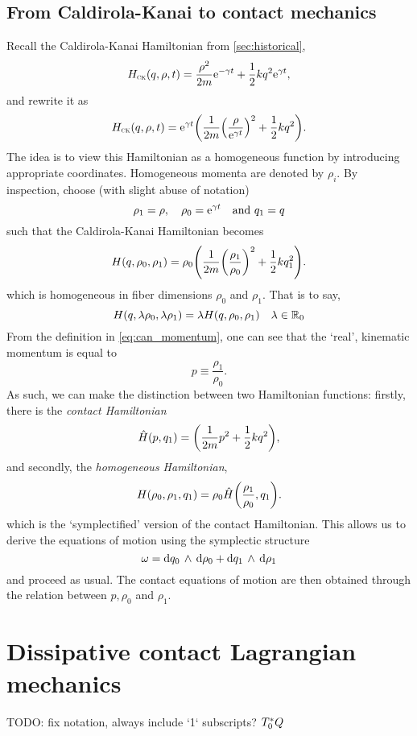 \subsection{From Caldirola-Kanai to contact mechanics}
Recall the Caldirola-Kanai Hamiltonian from \cref{sec:historical},
\begin{equation}
    H_\text{\tiny{\textsc{CK}}}(q, \rho, t) = \frac{\rho^2}{2m}\mathrm{e}^{-\gamma t} + \frac{1}{2}kq^2\mathrm{e}^{\gamma t},
    \label{eq:ham_CK2}
\end{equation}
and rewrite it as
\begin{equation}
    H_\text{\tiny{\textsc{CK}}}(q, \rho, t) = \mathrm{e}^{\gamma t}\qty(\frac{1}{2m}\qty(\frac{\rho}{\mathrm{e}^{\gamma t}})^2 + \frac{1}{2}kq^2).
\end{equation}
The idea is to view this Hamiltonian as a homogeneous function by introducing appropriate coordinates. Homogeneous momenta are denoted by $\rho_i$. By inspection, choose (with slight abuse of notation)
$$ \rho_1 = \rho,\quad \rho_0 = \mathrm{e}^{\gamma t}\quad \text{and } q_1 = q$$
such that the Caldirola-Kanai Hamiltonian becomes
\begin{equation}
    H(q, \rho_0, \rho_1) = \rho_0\qty(\frac{1}{2m}\qty(\frac{\rho_1}{\rho_0})^2 + \frac{1}{2}kq_1^2).
\end{equation}
which is homogeneous in fiber dimensions $\rho_0$ and $\rho_1$. That is to say,
$$ H(q, \lambda \rho_0, \lambda \rho_1) = \lambda H(q, \rho_0, \rho_1) \quad \lambda \in \mathbb{R}_0$$
From the definition in \cref{eq:can_momentum}, one can see that the `real', kinematic momentum is equal to
$$ p \equiv \frac{\rho_1}{\rho_0}. $$
As such, we can make the distinction between two Hamiltonian functions: firstly, there is the \emph{contact Hamiltonian}
$$ \hat{H}(p, q_1) = \qty(\frac{1}{2m}p^2 + \frac{1}{2}kq^2), $$
and secondly, the \emph{homogeneous Hamiltonian},
$$ H(\rho_0, \rho_1, q_1) = \rho_0 \hat{H}\qty(\frac{\rho_1}{\rho_0}, q_1).$$
which is the `symplectified' version of the contact Hamiltonian. This allows us to derive the equations of motion using the symplectic structure
$$ \omega =  \dd{q_0}\,\wedge\,\dd{\rho_0}  +  \dd{q_1}\,\wedge\,\dd{\rho_1} $$
and proceed as usual. The contact equations of motion are then obtained through the relation between $p, \rho_0$ and $\rho_1$.

\section{Dissipative contact Lagrangian mechanics}
TODO: fix notation, always include `1` subscripts?
$T^*_0Q$



